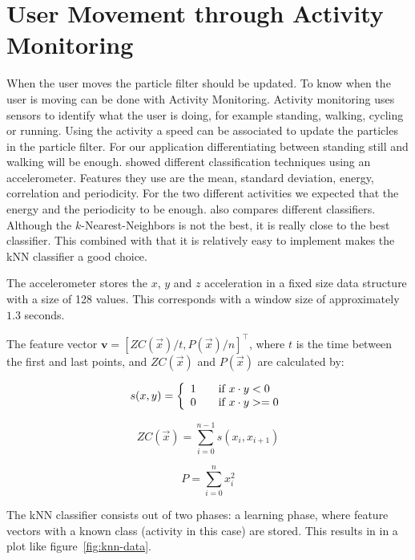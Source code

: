 \documentclass[journal]{IEEEtran}
\begin{document}
\section{User Movement through Activity Monitoring}

When the user moves the particle filter should be updated. To know when the
user is moving can be done with Activity Monitoring. Activity monitoring uses
sensors to identify what the user is doing, for example standing, walking,
cycling or running. Using the activity a speed can be associated to update the
particles in the particle filter. For our application differentiating between
standing still and walking will be enough. \cite{ravi2005activity} showed
different classification techniques using an accelerometer. Features they use
are the mean, standard deviation, energy, correlation and periodicity.  For the
two different activities we expected that the energy and the periodicity to
be enough. \cite{ravi2005activity} also compares different classifiers.
Although the $k$-Nearest-Neighbors is not the best, it is really close to the
best classifier. This combined with that it is relatively easy to implement
makes the kNN classifier a good choice.

The accelerometer stores the $x$, $y$ and $z$ acceleration in a fixed size
data structure with a size of 128 values. This corresponds with a window size
of approximately $1.3$ seconds.

The feature vector $\mathbf{v} = [ZC(\vec x) / t, P(\vec x)/ n]^\intercal$,
where $t$ is the time between the first and last points, and $ZC(\vec x)$ and
$P(\vec x)$ are calculated by:

\begin{equation}
  s(x,y) = \left\{
    \begin{array}{l l}
      1 & \quad \text{if~} x \cdot y < 0 \\
      0 & \quad \text{if~} x \cdot y >= 0
  \end{array} \right.
\end{equation}

\begin{equation}
  ZC(\vec x) = \sum^{n-1}_{i=0} s(x_i, x_{i+1})
\end{equation}

\begin{equation}
  P = \sum^{n}_{i=0} x_i^2
\end{equation}

The kNN classifier consists out of two phases: a learning phase, where feature
vectors with a known class (activity in this case) are stored. This results in
in a plot like figure~\ref{fig:knn-data}.
\end{document}
